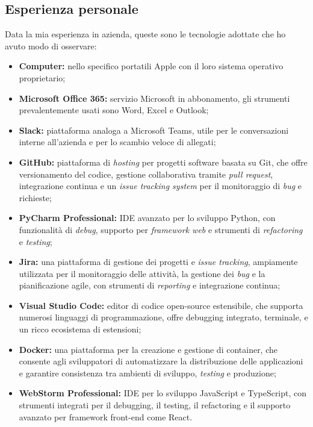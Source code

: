 \subsection{Esperienza personale}
Data la mia esperienza in azienda, queste sono le tecnologie adottate che ho avuto modo di osservare:
\begin{itemize}
	\item \textbf{Computer:} nello specifico portatili Apple con il loro sistema operativo proprietario;
	\item \textbf{Microsoft Office 365:} servizio Microsoft in abbonamento, gli strumenti prevalentemente usati sono Word, Excel e Outlook;
	\item \textbf{Slack:} piattaforma analoga a Microsoft Teams, utile per le conversazioni interne all'azienda e per lo scambio veloce di allegati;
	\item \textbf{GitHub:} piattaforma di \textit{hosting} per progetti software basata su Git, che offre versionamento del codice, gestione collaborativa tramite \textit{pull request}, integrazione continua e un \textit{issue tracking system} per il monitoraggio di \textit{bug} e richieste;
	\item \textbf{PyCharm Professional:} IDE avanzato per lo sviluppo Python, con funzionalità di \textit{debug}, supporto per \textit{framework web} e strumenti di \textit{refactoring} e \textit{testing};
	\item \textbf{Jira:} una piattaforma di gestione dei progetti e \textit{issue tracking}, ampiamente utilizzata per il monitoraggio delle attività, la gestione dei \textit{bug} e la pianificazione agile, con strumenti di \textit{reporting} e integrazione continua;
	\item \textbf{Visual Studio Code:} editor di codice open-source estensibile, che supporta numerosi linguaggi di programmazione, offre debugging integrato, terminale, e un ricco ecosistema di estensioni;
	\item \textbf{Docker:} una piattaforma per la creazione e gestione di container, che consente agli sviluppatori di automatizzare la distribuzione delle applicazioni e garantire consistenza tra ambienti di sviluppo, \textit{testing} e produzione;
	\item \textbf{WebStorm Professional:} IDE per lo sviluppo JavaScript e TypeScript, con strumenti integrati per il debugging, il testing, il refactoring e il supporto avanzato per framework front-end come React.
\end{itemize}

